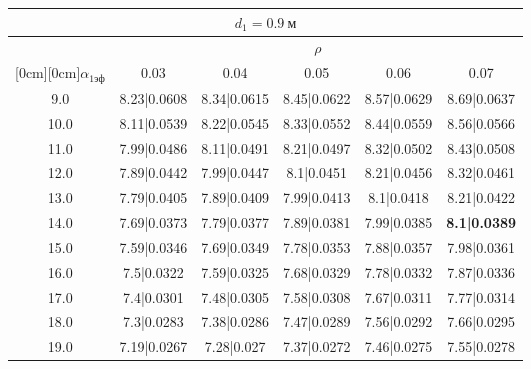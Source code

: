 \documentclass[20pt]{article}
\begin{document}
\begin{center}
\begin{tabular}{c|ccccc}
\hline
	\multicolumn{6}{c}{$d_{1}=0.9 \ м$} \\
\hline
	 & \multicolumn{5}{|c}{$\rho$} \\
	\cline{2-6}
	\raisebox{1.5ex}[0cm][0cm]{$\alpha_{1эф}$} & 0.03 & 0.04 & 0.05 & 0.06 & 0.07\\
\hline
	9.0 & 	8.23|0.0608 & 	8.34|0.0615 & 	8.45|0.0622 & 	8.57|0.0629 & 	8.69|0.0637\\
	10.0 & 	8.11|0.0539 & 	8.22|0.0545 & 	8.33|0.0552 & 	8.44|0.0559 & 	8.56|0.0566\\
	11.0 & 	7.99|0.0486 & 	8.11|0.0491 & 	8.21|0.0497 & 	8.32|0.0502 & 	8.43|0.0508\\
	12.0 & 	7.89|0.0442 & 	7.99|0.0447 & 	8.1|0.0451 & 	8.21|0.0456 & 	8.32|0.0461\\
	13.0 & 	7.79|0.0405 & 	7.89|0.0409 & 	7.99|0.0413 & 	8.1|0.0418 & 	8.21|0.0422\\
	14.0 & 	7.69|0.0373 & 	7.79|0.0377 & 	7.89|0.0381 & 	7.99|0.0385 & 	\textbf{8.1|0.0389}\\
	15.0 & 	7.59|0.0346 & 	7.69|0.0349 & 	7.78|0.0353 & 	7.88|0.0357 & 	7.98|0.0361\\
	16.0 & 	7.5|0.0322 & 	7.59|0.0325 & 	7.68|0.0329 & 	7.78|0.0332 & 	7.87|0.0336\\
	17.0 & 	7.4|0.0301 & 	7.48|0.0305 & 	7.58|0.0308 & 	7.67|0.0311 & 	7.77|0.0314\\
	18.0 & 	7.3|0.0283 & 	7.38|0.0286 & 	7.47|0.0289 & 	7.56|0.0292 & 	7.66|0.0295\\
	19.0 & 	7.19|0.0267 & 	7.28|0.027 & 	7.37|0.0272 & 	7.46|0.0275 & 	7.55|0.0278\\
\end{tabular}


\end{center}
\end{document}
